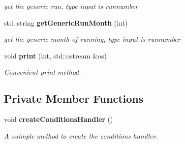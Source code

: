 \begin{DoxyCompactItemize}
\begin{DoxyCompactList}\small\item\em get the generic run, type input is runnumber \item\end{DoxyCompactList}\item 
std::string {\bf getGenericRunMonth} (int)\label{classCALICE_1_1RunLocationWhizard_a2ab07e3feac0ec3dc7f71df06029a7b6}

\begin{DoxyCompactList}\small\item\em get the generic month of running, type input is runnumber \item\end{DoxyCompactList}\item 
void {\bf print} (int, std::ostream \&os)\label{classCALICE_1_1RunLocationWhizard_a361b56dadac488123034eec312ad891c}

\begin{DoxyCompactList}\small\item\em Convenient print method. \item\end{DoxyCompactList}\end{DoxyCompactItemize}
\subsection*{Private Member Functions}
\begin{DoxyCompactItemize}
\item 
void {\bf createConditionsHandler} ()\label{classCALICE_1_1RunLocationWhizard_ab4eb27f5fb121858ead5d27be5bf45f3}

\begin{DoxyCompactList}\small\item\em A suimple method to create the conditions handler. \item\end{DoxyCompactList}\end{DoxyCompactItemize}
